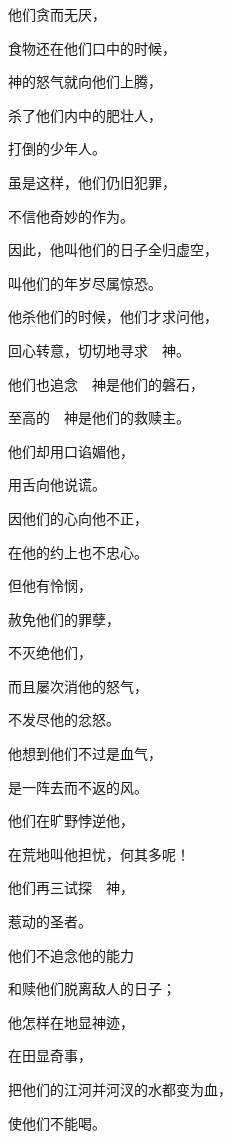 {\par }{\Q {}他们贪而无厌，
\par }{\Q 食物还在他们口中的时候，
\par }{\Q {}神的怒气就向他们上腾，
\par }{\Q 杀了他们内中的肥壮人，
\par }{\Q 打倒{}的少年人。
\par }{\BB \par }{\Q {}虽是这样，他们仍旧犯罪，
\par }{\Q 不信他奇妙的作为。
\par }{\Q {}因此，他叫他们的日子全归虚空，
\par }{\Q 叫他们的年岁尽属惊恐。
\par }{\Q {}他杀他们的时候，他们才求问他，
\par }{\Q 回心转意，切切地寻求　神。
\par }{\Q {}他们也追念　神是他们的磐石，
\par }{\Q 至高的　神是他们的救赎主。
\par }{\Q {}他们却用口谄媚他，
\par }{\Q 用舌向他说谎。
\par }{\Q {}因他们的心向他不正，
\par }{\Q 在他的约上也不忠心。
\par }{\Q {}但他有怜悯，
\par }{\Q 赦免他们的罪孽，
\par }{\Q 不灭绝他们，
\par }{\Q 而且屡次消他的怒气，
\par }{\Q 不发尽他的忿怒。
\par }{\Q {}他想到他们不过是血气，
\par }{\Q 是一阵去而不返的风。
\par }{\Q {}他们在旷野悖逆他，
\par }{\Q 在荒地叫他担忧，何其多呢！
\par }{\Q {}他们再三试探　神，
\par }{\Q 惹动{}的圣者。
\par }{\Q {}他们不追念他的能力
\par }{\Q 和赎他们脱离敌人的日子；
\par }{\Q {}他怎样在{}地显神迹，
\par }{\Q 在{}田显奇事，
\par }{\Q {}把他们的江河并河汊的水都变为血，
\par }{\Q 使他们不能喝。
}
